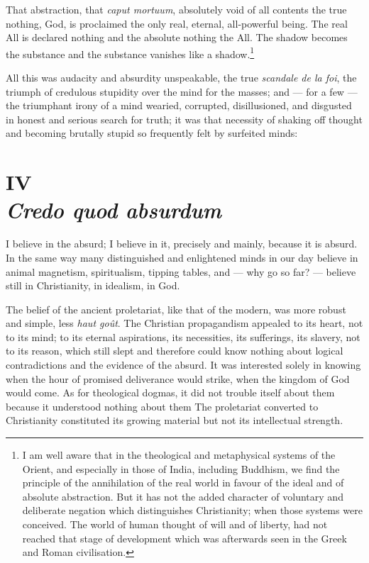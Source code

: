 \documentclass[12pt]{report}
\begin{document}
That abstraction, that \emph{caput mortuum}, absolutely void of all contents the true nothing, God, is proclaimed the only real, eternal, all-powerful being. The real All is declared nothing and the absolute nothing the All. The shadow becomes the substance and the substance vanishes like a shadow.\footnote{I am well aware that in the theological and metaphysical systems of the Orient, and especially in those of India, including Buddhism, we find the principle of the annihilation of the real world in favour of the ideal and of absolute abstraction. But it has not the added character of voluntary and deliberate negation which distinguishes Christianity; when those systems were conceived. The world of human thought of will and of liberty, had not reached that stage of development which was afterwards seen in the Greek and Roman civilisation.}


All this was audacity and absurdity unspeakable, the true \emph{scandale de la foi}, the triumph of credulous stupidity over the mind for the masses; and — for a few — the triumphant irony of a mind wearied, corrupted, disillusioned, and disgusted in honest and serious search for truth; it was that necessity of shaking off thought and becoming brutally stupid so frequently felt by surfeited minds:

\chapter*{IV \\ \LARGE \emph{Credo quod absurdum}}

I believe in the absurd; I believe in it, precisely and mainly, because it is absurd. In the same way many distinguished and enlightened minds in our day believe in animal magnetism, spiritualism, tipping tables, and — why go so far? — believe still in Christianity, in idealism, in God.


The belief of the ancient proletariat, like that of the modern, was more robust and simple, less \emph{haut goût}. The Christian propagandism appealed to its heart, not to its mind; to its eternal aspirations, its necessities, its sufferings, its slavery, not to its reason, which still slept and therefore could know nothing about logical contradictions and the evidence of the absurd. It was interested solely in knowing when the hour of promised deliverance would strike, when the kingdom of God would come. As for theological dogmas, it did not trouble itself about them because it understood nothing about them The proletariat converted to Christianity constituted its growing material but not its intellectual strength.
\end{document}
